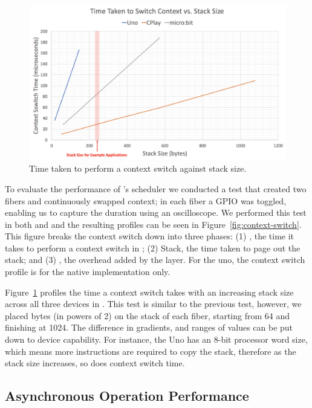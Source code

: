 \begin{figure}[ht]
    \includegraphics[width=.78\columnwidth]{images/context-vs-stack.png}
\caption{\label{fig:context-vs-stack}Time taken to perform a context switch against stack size.}
\end{figure}

To evaluate the performance of \CON's scheduler we conducted a test that created two fibers and continuously swapped context; in each fiber a GPIO was toggled, enabling us to capture the duration using an oscilloscope. We performed this test in both \MC and \CO and the resulting profiles can be seen in Figure~\ref{fig:context-switch}. This figure breaks the context switch down into three phases: (1) \CO, the time it takes to perform a context switch in \CO; (2) Stack, the time taken to page out the \MC stack; and (3) \MC, the overhead added by the \MC layer. For the uno, the context switch profile is for the native implementation only.

Figure~\ref{fig:context-vs-stack} profiles the time a context switch takes with an increasing stack size across all three devices in \CO. This test is similar to the previous test, however, we placed bytes (in powers of 2) on the stack of each fiber, starting from 64 and finishing at 1024. The difference in gradients, and ranges of values can be put down to device capability. For instance, the Uno has an 8-bit processor word size, which means more instructions are required to copy the stack, therefore as the stack size increases, so does context switch time.

\subsection{Asynchronous Operation Performance}

